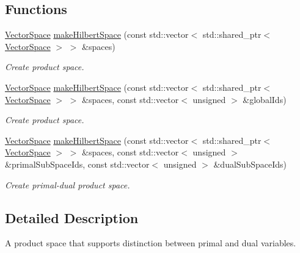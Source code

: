 \subsection*{Functions}
\begin{DoxyCompactItemize}
\item 
\hyperlink{classSpacy_1_1VectorSpace}{Vector\+Space} \hyperlink{group__ProductSpaceGroup_gad4b421dd4563c7d575550ab4d5d3ff0d}{make\+Hilbert\+Space} (const std\+::vector$<$ std\+::shared\+\_\+ptr$<$ \hyperlink{classSpacy_1_1VectorSpace}{Vector\+Space} $>$ $>$ \&spaces)
\begin{DoxyCompactList}\small\item\em Create product space. \end{DoxyCompactList}\item 
\hyperlink{classSpacy_1_1VectorSpace}{Vector\+Space} \hyperlink{group__ProductSpaceGroup_gaee9c55c4b0f0b9d41bb6e1eba80f829f}{make\+Hilbert\+Space} (const std\+::vector$<$ std\+::shared\+\_\+ptr$<$ \hyperlink{classSpacy_1_1VectorSpace}{Vector\+Space} $>$ $>$ \&spaces, const std\+::vector$<$ unsigned $>$ \&global\+Ids)
\begin{DoxyCompactList}\small\item\em Create product space. \end{DoxyCompactList}\item 
\hyperlink{classSpacy_1_1VectorSpace}{Vector\+Space} \hyperlink{group__ProductSpaceGroup_ga5146524c4a6b3cb6f4a47b877cb2f55d}{make\+Hilbert\+Space} (const std\+::vector$<$ std\+::shared\+\_\+ptr$<$ \hyperlink{classSpacy_1_1VectorSpace}{Vector\+Space} $>$ $>$ \&spaces, const std\+::vector$<$ unsigned $>$ \&primal\+Sub\+Space\+Ids, const std\+::vector$<$ unsigned $>$ \&dual\+Sub\+Space\+Ids)
\begin{DoxyCompactList}\small\item\em Create primal-\/dual product space. \end{DoxyCompactList}\end{DoxyCompactItemize}


\subsection{Detailed Description}
A product space that supports distinction between primal and dual variables. 